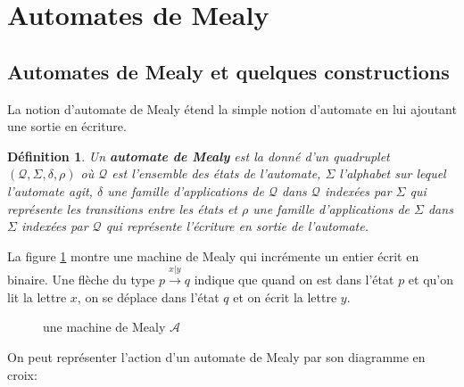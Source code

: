 \documentclass[11pt,a4paper]{article}
\newtheorem{definition}{Définition}
\begin{document}
\section{Automates de Mealy}

\subsection{Automates de Mealy et quelques constructions}

La notion d'automate de Mealy étend la simple notion d'automate en lui ajoutant une sortie en écriture.

\begin{definition}
  Un \textbf{automate de Mealy} est la donné d'un quadruplet $\left(\mathcal{Q}, \Sigma, \delta, \rho\right)$ où $\mathcal{Q}$ est l'ensemble des états de l'automate, $\Sigma$ l'alphabet sur lequel l'automate agit, $\delta$ une famille d'applications de $\mathcal{Q}$ dans $\mathcal{Q}$ indexées par $\Sigma$ qui représente les transitions entre les états et $\rho$ une famille d'applications de $\Sigma$ dans $\Sigma$ indexées par $\mathcal{Q}$ qui représente l'écriture en sortie de l'automate.
\end{definition}

La figure \ref{fig:example} montre une machine de Mealy qui incrémente un entier écrit en binaire. Une flèche du type $p\overset{x|y}{\longrightarrow}q$ indique que quand on est dans l'état $p$ et qu'on lit la lettre $x$, on se déplace dans l'état $q$ et on écrit la lettre $y$.

\begin{figure}[h]
  \begin{center}
    \caption{une machine de Mealy $\mathcal{A}$ \label{fig:example}}
  \end{center}
\end{figure}

On peut représenter l'action d'un automate de Mealy par son diagramme en croix:
\end{document}
